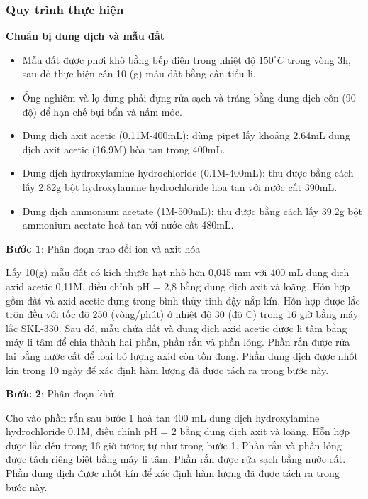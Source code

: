         
    \subsubsection{Quy trình thực hiện}

        \textbf{Chuẩn bị dung dịch và mẫu đất}
        \begin{itemize}
            \item Mẫu đất được phơi khô bằng bếp điện trong nhiệt độ $150^\circ C$ trong vòng 3h, sau đố thực hiện cân 10 (g) mẫu đất bằng cân tiểu li.
            \item Ống nghiệm và lọ đựng phải đựng rửa sạch và tráng bằng dung dịch cồn (90 độ) để hạn chế bụi bẩn và nấm móc.
            \item  Dung dịch axit acetic (0.11M-400mL): dùng pipet lấy khoảng 2.64mL dung dịch axit acetic (16.9M) hòa tan trong 400mL.
            \item  Dung dịch hydroxylamine hydrochloride (0.1M-400mL): thu được bằng cách lấy 2.82g bột hydroxylamine hydrochloride hoa tan với nước cất 390mL.
            \item  Dung dịch ammonium acetate  (1M-500mL): thu được bằng cách lấy 39.2g bột ammonium acetate hoà tan với nước cất 480mL.
        \end{itemize}


        \textbf{Bước 1}: Phân đoạn trao đổi ion và axit hóa
        
        Lấy 10(g) mẫu đất có kích thước hạt nhỏ hơn 0,045 mm với 400 mL dung dịch axid acetic 0,11M, điều chỉnh pH = 2,8 bằng dung dịch axit  và  loãng. Hỗn hợp gồm đất và axid acetic đựng trong bình thủy tinh đậy nắp kín. Hỗn hợp được lắc trộn đều với tốc độ 250 (vòng/phút) ở nhiệt độ 30 (độ C) trong 16 giờ bằng máy lắc SKL-330. Sau đó, mẫu chứa đất và dung dịch axid acetic được li tâm bằng máy li tâm để chia thành hai phần, phần rắn và phần lỏng. Phần rắn được rửa lại bằng nước cất để loại bỏ lượng axid còn tồn đọng. Phần dung dịch được nhốt kín trong 10 ngày để xác định hàm lượng  đã được tách ra trong bước này.        

        \textbf{Bước 2}: Phân đoạn khử
        
        Cho vào phần rắn sau bước 1 hoà tan 400 mL dung dịch hydroxylamine hydrochloride 0.1M, điều chỉnh pH = 2 bằng dung dịch axit  và  loãng. Hỗn hợp được lắc đều trong 16 giờ tương tự như trong bước 1. Phần rắn và phần lỏng được tách riêng biệt bằng máy li tâm. Phần rắn được rửa sạch bằng nước cất. Phần dung dịch được nhốt kín để xác định hàm lượng  đã được tách ra trong bước này. 
        
